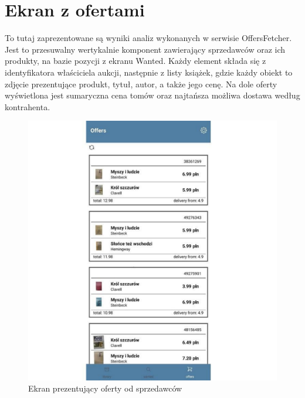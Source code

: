 \section{Ekran z ofertami}
To tutaj zaprezentowane są wyniki analiz wykonanych w serwisie OffersFetcher. Jest to przesuwalny wertykalnie komponent zawierający sprzedawców oraz ich produkty, na bazie pozycji z ekranu Wanted. Każdy element składa się z identyfikatora właściciela aukcji, następnie z listy książek, gdzie każdy obiekt to zdjęcie prezentujące produkt, tytuł, autor, a także jego cenę. Na dole oferty wyświetlona jest sumaryczna cena tomów oraz najtańsza możliwa dostawa według kontrahenta.
\begin{figure}[H]
	\centering
	\includegraphics[width=\linewidth]{offers.pdf}
	\caption{Ekran prezentujący oferty od sprzedawców}
\end{figure}


